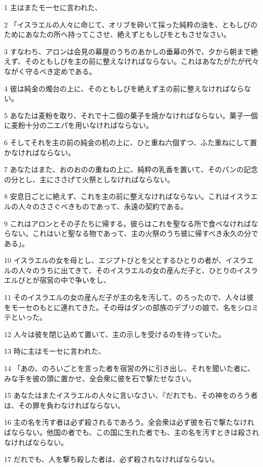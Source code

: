 \par 1 主はまたモーセに言われた、
\par 2 「イスラエルの人々に命じて、オリブを砕いて採った純粋の油を、ともしびのためにあなたの所へ持ってこさせ、絶えずともしびをともさせなさい。
\par 3 すなわち、アロンは会見の幕屋のうちのあかしの垂幕の外で、夕から朝まで絶えず、そのともしびを主の前に整えなければならない。これはあなたがたが代々ながく守るべき定めである。
\par 4 彼は純金の燭台の上に、そのともしびを絶えず主の前に整えなければならない。
\par 5 あなたは麦粉を取り、それで十二個の菓子を焼かなければならない。菓子一個に麦粉十分の二エパを用いなければならない。
\par 6 そしてそれを主の前の純金の机の上に、ひと重ね六個ずつ、ふた重ねにして置かなければならない。
\par 7 あなたはまた、おのおのの重ねの上に、純粋の乳香を置いて、そのパンの記念の分とし、主にささげて火祭としなければならない。
\par 8 安息日ごとに絶えず、これを主の前に整えなければならない。これはイスラエルの人々のささぐべきものであって、永遠の契約である。
\par 9 これはアロンとその子たちに帰する。彼らはこれを聖なる所で食べなければならない。これはいと聖なる物であって、主の火祭のうち彼に帰すべき永久の分である」。
\par 10 イスラエルの女を母とし、エジプトびとを父とするひとりの者が、イスラエルの人々のうちに出てきて、そのイスラエルの女の産んだ子と、ひとりのイスラエルびとが宿営の中で争いをし、
\par 11 そのイスラエルの女の産んだ子が主の名を汚して、のろったので、人々は彼をモーセのもとに連れてきた。その母はダンの部族のデブリの娘で、名をシロミテといった。
\par 12 人々は彼を閉じ込めて置いて、主の示しを受けるのを待っていた。
\par 13 時に主はモーセに言われた、
\par 14 「あの、のろいごとを言った者を宿営の外に引き出し、それを聞いた者に、みな手を彼の頭に置かせ、全会衆に彼を石で撃たせなさい。
\par 15 あなたはまたイスラエルの人々に言いなさい、『だれでも、その神をのろう者は、その罪を負わなければならない。
\par 16 主の名を汚す者は必ず殺されるであろう。全会衆は必ず彼を石で撃たなければならない。他国の者でも、この国に生れた者でも、主の名を汚すときは殺されなければならない。
\par 17 だれでも、人を撃ち殺した者は、必ず殺されなければならない。
